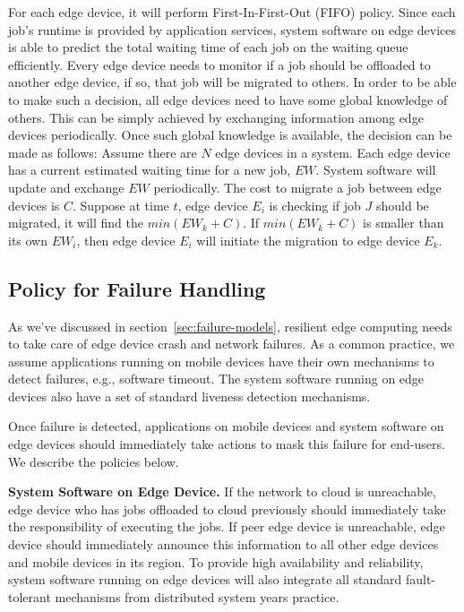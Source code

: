 For each edge device, it will perform First-In-First-Out (FIFO) policy. Since each job's runtime
is provided by application services, system software on edge devices is able to predict the total waiting time of each job
on the waiting queue efficiently. Every edge device needs to monitor if a job should be offloaded to another edge device,
if so, that job will be migrated to others.
In order to be able to make such a decision, all edge devices need to have some global knowledge
of others. This can be simply achieved by exchanging information among edge devices periodically.
Once such global knowledge is available, the decision can be made as follows: Assume there are \(N\)
edge devices in a system. Each edge device has a current estimated waiting time for a new job, \(EW\).
System software will update and exchange \(EW\) periodically.
The cost to migrate a job between edge devices is \(C\). Suppose at time \(t\), edge device \(E_i\) is
checking if job \(J\) should be migrated, it will find the \(min(EW_k + C)\).
If \(min(EW_k + C)\) is smaller than its own \(EW_i\), then edge device \(E_i\) will initiate the migration
to edge device \(E_k\).

\subsection{Policy for Failure Handling}
\label{sec:policy-fault}
As we've discussed in section~\ref{sec:failure-models}, resilient edge computing needs to
take care of edge device crash and network failures. As a common practice, we assume applications running on mobile
devices have their own mechanisms to detect failures, e.g., software timeout. The system
software running on edge devices also have a set of standard liveness detection mechanisms.

Once failure is detected, applications on mobile devices and system software on edge devices
should immediately take actions to mask this failure for end-users. We describe the policies below.

\hfill\break
\noindent \textbf{System Software on Edge Device.}
If the network to cloud is unreachable, edge device who has jobs offloaded to cloud previously should
immediately take the responsibility of executing the jobs. If peer edge device is unreachable,
edge device should immediately announce this information to all other edge devices and mobile devices
in its region. To provide high availability and reliability, system software running on edge devices
will also integrate all standard fault-tolerant mechanisms from distributed system years practice\cite{cavage-queue13,google-acm16}.

